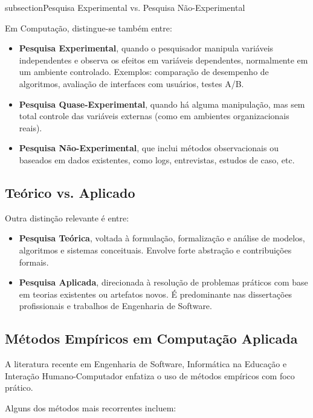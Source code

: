 subsection{Pesquisa Experimental vs. Pesquisa Não-Experimental}

Em Computação, distingue-se também entre:

\begin{itemize}
\item \textbf{Pesquisa Experimental}, quando o pesquisador manipula variáveis independentes e observa os efeitos em variáveis dependentes, normalmente em um ambiente controlado. Exemplos: comparação de desempenho de algoritmos, avaliação de interfaces com usuários, testes A/B.
\item \textbf{Pesquisa Quase-Experimental}, quando há alguma manipulação, mas sem total controle das variáveis externas (como em ambientes organizacionais reais).

\item \textbf{Pesquisa Não-Experimental}, que inclui métodos observacionais ou baseados em dados existentes, como logs, entrevistas, estudos de caso, etc.
\end{itemize}


\subsection{Teórico vs. Aplicado}

Outra distinção relevante é entre:

\begin{itemize}
\item \textbf{Pesquisa Teórica}, voltada à formulação, formalização e análise de modelos, algoritmos e sistemas conceituais. Envolve forte abstração e contribuições formais.
\item \textbf{Pesquisa Aplicada}, direcionada à resolução de problemas práticos com base em teorias existentes ou artefatos novos. É predominante nas dissertações profissionais e trabalhos de Engenharia de Software.
\end{itemize}

\subsection{Métodos Empíricos em Computação Aplicada}

A literatura recente em Engenharia de Software, Informática na Educação e Interação Humano-Computador enfatiza o uso de métodos empíricos com foco prático. 

Alguns dos métodos mais recorrentes incluem:

